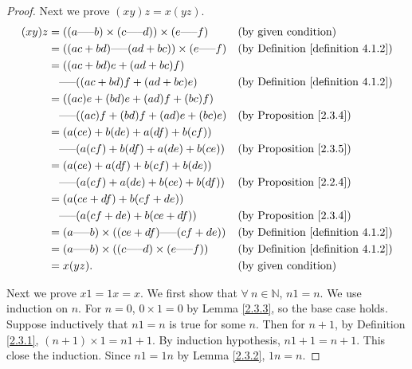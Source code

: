 \begin{proof}
Next we prove \((xy)z = x(yz)\).
\begin{align*}
(xy)z &= ((a \text{-----} b) \times (c \text{-----} d)) \times (e \text{-----} f) && \text{(by given condition)} \\
&= ((ac + bd) \text{-----} (ad + bc)) \times (e \text{-----} f) && \text{(by Definition \ref{definition 4.1.2})} \\
&= ((ac + bd)e + (ad + bc)f) \\
&\quad \text{-----} ((ac + bd)f + (ad + bc)e) && \text{(by Definition \ref{definition 4.1.2})} \\
&= ((ac)e + (bd)e + (ad)f + (bc)f) \\
&\quad \text{-----} ((ac)f + (bd)f + (ad)e + (bc)e) && \text{(by Proposition \ref{2.3.4})} \\
&= (a(ce) + b(de) + a(df) + b(cf)) \\
&\quad \text{-----} (a(cf) + b(df) + a(de) + b(ce)) && \text{(by Proposition \ref{2.3.5})} \\
&= (a(ce) + a(df) + b(cf) + b(de)) \\
&\quad \text{-----} (a(cf) + a(de) + b(ce) + b(df)) && \text{(by Proposition \ref{2.2.4})} \\
&= (a(ce + df) + b(cf + de)) \\
&\quad \text{-----} (a(cf + de) + b(ce + df)) && \text{(by Proposition \ref{2.3.4})} \\
&= (a \text{-----} b) \times ((ce + df) \text{-----} (cf + de)) && \text{(by Definition \ref{definition 4.1.2})} \\
&= (a \text{-----} b) \times ((c \text{-----} d) \times (e \text{-----} f)) && \text{(by Definition \ref{definition 4.1.2})} \\
&= x(yz). && \text{(by given condition)}
\end{align*}

Next we prove \(x1 = 1x = x\).
We first show that \(\forall\ n \in \mathds{N}\), \(n1 = n\).
We use induction on \(n\).
For \(n=0\), \(0 \times 1 = 0\) by Lemma \ref{2.3.3}, so the base case holds.
Suppose inductively that \(n1 = n\) is true for some \(n\).
Then for \(n + 1\), by Definition \ref{2.3.1}, \((n + 1) \times 1 = n1 + 1\).
By induction hypothesis, \(n1 + 1 = n + 1\).
This close the induction.
Since \(n1 = 1n\) by Lemma \ref{2.3.2}, \(1n = n\).


\end{proof}
